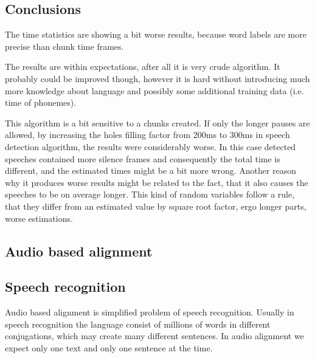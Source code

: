 \documentclass[12pt,a4paper,english]{article}
\begin{document}
\subsection{Conclusions}

The time statistics are showing a bit worse results, because word labels are more precise than chunk time frames. \newline

The results are within expectations, after all it is very crude algorithm. It probably could be improved though, however it is hard without introducing much more knowledge about language and possibly some additional training data (i.e. time of phonemes). \newline

This algorithm is a bit sensitive to a chunks created. If only the longer pauses are allowed, by increasing the holes filling factor from 200ms to 300ms in  speech detection algorithm, the results were considerably worse. \newline
In this case detected speeches contained more silence frames and consequently the total time is different, and the estimated times might be a bit more wrong. Another reason why it produces worse results might be related to the fact, that it also causes the speeches to be on average longer. This kind of random variables follow a rule, that they differ from an estimated value by square root factor, ergo longer parts, worse estimations.

\newpage
\begin{center}
    \section{Audio based alignment}
\end {center}
\subsection{Speech recognition}

Audio based alignment is simplified problem of speech recognition. Usually in speech recognition the language consist of millions of words in different conjugations, which may create many different sentences. In audio alignment we expect only one text and only one sentence at the time. \newline
\end{document}
